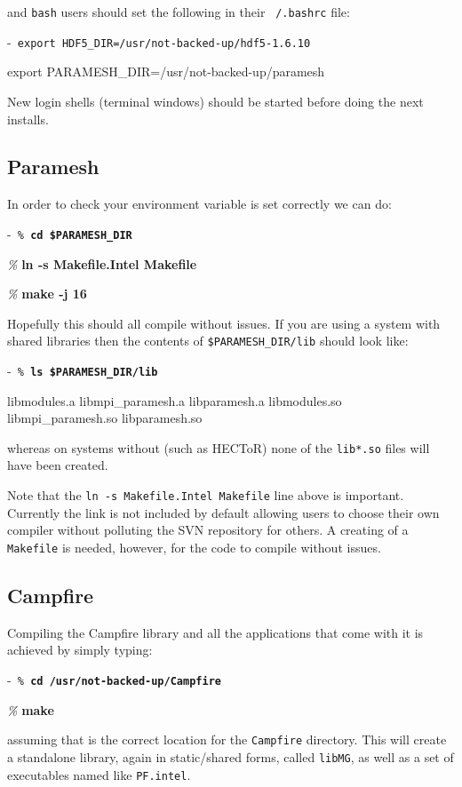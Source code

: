 \documentclass[paper=a4, fontsize=11pt,twoside,bibtotoc]{scrartcl}		%
\newenvironment{codebox}{\begin{center}\begin{MakeFramed}{\hsize0.99\linewidth\advance\hsize-\width\FrameRestore}\tt}{\end{MakeFramed}\end{center}}
\newcommand{\prompt}[1]{\textsl{\%} \textbf{#1}}
\begin{document}
\noindent and \texttt{bash} users should set	the following in their \texttt{~/.bashrc} file:
\begin{codebox}
        export HDF5\_DIR=/usr/not-backed-up/hdf5-1.6.10

        export PARAMESH\_DIR=/usr/not-backed-up/paramesh
\end{codebox}

\noindent New login shells (terminal windows) should be started before doing the next installs.


\subsection{Paramesh}

In order to check your environment variable is set correctly we can do:

\begin{codebox}
	\prompt{cd \$PARAMESH\_DIR}

	\prompt{ln -s Makefile.Intel Makefile}

	\prompt{make -j 16}
\end{codebox}

Hopefully this should all compile without issues.  If you are using a system with shared libraries then the contents of \texttt{\$PARAMESH\_DIR/lib} should look 
like:
\begin{codebox}
	\prompt{ls \$PARAMESH\_DIR/lib}

	libmodules.a   libmpi\_paramesh.a   libparamesh.a
	libmodules.so  libmpi\_paramesh.so  libparamesh.so
\end{codebox}
whereas on systems without (such as HECToR) none of the \texttt{lib*.so} files will have been created.

Note that the \texttt{ln -s Makefile.Intel Makefile} line above is important.  Currently the link is not included by default allowing users to choose their own 
compiler without polluting the SVN repository for others.  A creating of a \texttt{Makefile} is needed, however, for the code to compile without issues.

\subsection{Campfire}

Compiling the Campfire library and all the applications that come with it is achieved by simply typing:

\begin{codebox}
	\prompt{cd /usr/not-backed-up/Campfire}

	\prompt{make}
\end{codebox}
assuming that is the correct location for the \texttt{Campfire} directory.  This will create a standalone library, again in static/shared forms, called 
\texttt{libMG}, as well as a set of executables named like \texttt{PF.intel}.
\end{document}
